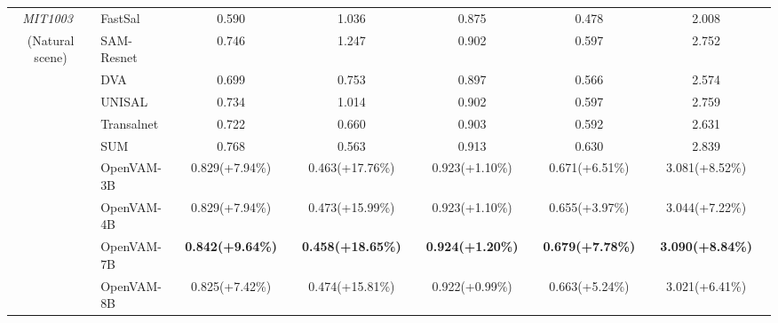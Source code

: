 \begin{table}[t]
{\begin{tabular}{c|lcccccccccc}
    \textit{MIT1003}~\cite{judd2009learning}
    & FastSal~\cite{hu2021fastsal} & 0.590 && 1.036 && 0.875 && 0.478 && 2.008 & \\
    (Natural scene)
    & SAM-Resnet~\cite{cornia2018predicting} & 0.746 && 1.247 && 0.902 && 0.597 && 2.752 & \\
    & DVA~\cite{wang2017deep} & 0.699 && 0.753 && 0.897 && 0.566 && 2.574 & \\
    & UNISAL~\cite{droste2020unified} & 0.734 && 1.014 && 0.902 && 0.597 && 2.759 & \\
    & Transalnet~\cite{lou2022transalnet} & 0.722 && 0.660 && 0.903 && 0.592 && 2.631 & \\
    & SUM~\cite{hosseini2025sum} & 0.768 && 0.563 && 0.913 && 0.630 && 2.839 & \\
    \cmidrule{2-12}
    & \cellcolor[HTML]{DADCFF}OpenVAM-3B
    & \cellcolor[HTML]{DADCFF}0.829\scriptsize{(+7.94\%)} && 
      \cellcolor[HTML]{DADCFF}0.463\scriptsize{(+17.76\%)} && 
      \cellcolor[HTML]{DADCFF}0.923\scriptsize{(+1.10\%)} && 
      \cellcolor[HTML]{DADCFF}0.671\scriptsize{(+6.51\%)} && 
      \cellcolor[HTML]{DADCFF}3.081\scriptsize{(+8.52\%)} & \\
    & \cellcolor[HTML]{DADCFF}OpenVAM-4B
    & \cellcolor[HTML]{DADCFF}0.829\scriptsize{(+7.94\%)} && 
      \cellcolor[HTML]{DADCFF}0.473\scriptsize{(+15.99\%)} && 
      \cellcolor[HTML]{DADCFF}0.923\scriptsize{(+1.10\%)} && 
      \cellcolor[HTML]{DADCFF}0.655\scriptsize{(+3.97\%)} && 
      \cellcolor[HTML]{DADCFF}3.044\scriptsize{(+7.22\%)} & \\
    & \cellcolor[HTML]{DADCFF}OpenVAM-7B
    & \cellcolor[HTML]{DADCFF}\textbf{0.842\scriptsize{(+9.64\%)}} && 
      \cellcolor[HTML]{DADCFF}\textbf{0.458\scriptsize{(+18.65\%)}} && 
      \cellcolor[HTML]{DADCFF}\textbf{0.924\scriptsize{(+1.20\%)}} && 
      \cellcolor[HTML]{DADCFF}\textbf{0.679\scriptsize{(+7.78\%)}} && 
      \cellcolor[HTML]{DADCFF}\textbf{3.090\scriptsize{(+8.84\%)}} & \\
    & \cellcolor[HTML]{DADCFF}OpenVAM-8B
    & \cellcolor[HTML]{DADCFF}0.825\scriptsize{(+7.42\%)} && 
      \cellcolor[HTML]{DADCFF}0.474\scriptsize{(+15.81\%)} && 
      \cellcolor[HTML]{DADCFF}0.922\scriptsize{(+0.99\%)} && 
      \cellcolor[HTML]{DADCFF}0.663\scriptsize{(+5.24\%)} && 
      \cellcolor[HTML]{DADCFF}3.021\scriptsize{(+6.41\%)} & \\
    \bottomrule
    \end{tabular}
    }
    \vspace{-2em}
\end{table}
